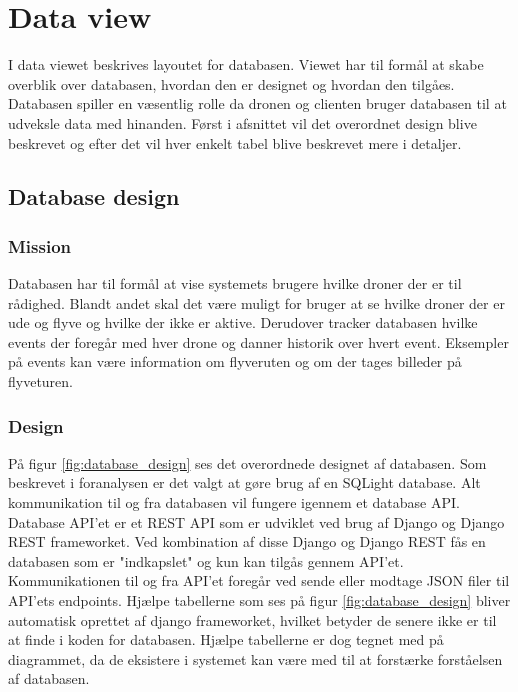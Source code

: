 \section{Data view}

I data viewet beskrives layoutet for databasen. Viewet har til formål at skabe overblik over databasen, hvordan den er designet og hvordan den tilgåes. Databasen spiller en væsentlig rolle da dronen og clienten bruger databasen til at udveksle data med hinanden. Først i afsnittet vil det overordnet design blive beskrevet og efter det vil hver enkelt tabel blive beskrevet mere i detaljer. 

\subsection{Database design}

\subsubsection*{Mission}
Databasen har til formål at vise systemets brugere hvilke droner der er til rådighed. Blandt andet skal det være muligt for bruger at se hvilke droner der er ude og flyve og hvilke der ikke er aktive. Derudover tracker databasen hvilke events der foregår med hver drone og danner historik over hvert event. Eksempler på events kan være information om flyveruten og om der tages billeder på flyveturen.

\subsubsection*{Design}
På figur \ref{fig:database_design} ses det overordnede designet af databasen. Som beskrevet i foranalysen er det valgt at gøre brug af en SQLight database. Alt kommunikation til og fra databasen vil fungere igennem et database API. Database API'et er et REST API som er udviklet ved brug af Django og Django REST frameworket. Ved kombination af disse Django og Django REST fås en databasen som er "indkapslet" og kun kan tilgås gennem API'et. Kommunikationen til og fra API'et foregår ved sende eller modtage JSON filer til API'ets endpoints. Hjælpe tabellerne som ses på figur \ref{fig:database_design} bliver automatisk oprettet af django frameworket, hvilket betyder de senere ikke er til at finde i koden for databasen. Hjælpe tabellerne er dog tegnet med på diagrammet, da de eksistere i systemet kan være med til at forstærke forståelsen af databasen. 


